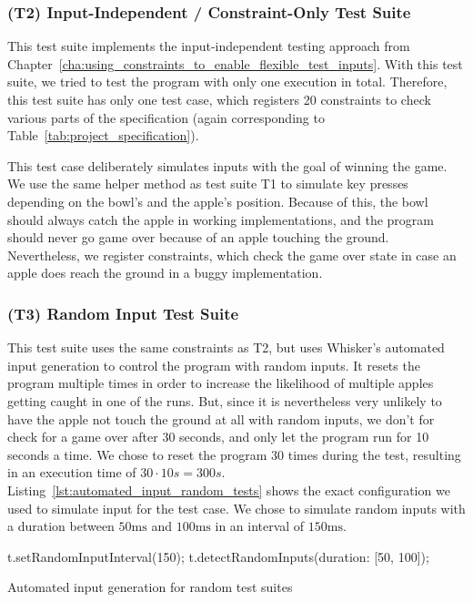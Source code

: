 \subsubsection{(T2) Input-Independent / Constraint-Only Test Suite}

This test suite implements the input-independent testing approach from Chapter~\ref{cha:using_constraints_to_enable_flexible_test_inputs}.
With this test suite, we tried to test the program with only one execution in total.
Therefore, this test suite has only one test case, which registers 20 constraints to check various parts of the specification
(again corresponding to Table~\ref{tab:project_specification}).
\parspace

This test case deliberately simulates inputs with the goal of winning the game.
We use the same helper method as test suite T1 to simulate key presses depending on the bowl's and the apple's position.
Because of this, the bowl should always catch the apple in working implementations,
and the program should never go game over because of an apple touching the ground.
Nevertheless, we register constraints, which check the game over state in case an apple does reach the ground in a buggy implementation.

\subsubsection{(T3) Random Input Test Suite}

This test suite uses the same constraints as T2, but uses Whisker's automated input generation to control the program with random inputs.
It resets the program multiple times in order to increase the likelihood of multiple apples getting caught in one of the runs.
But, since it is nevertheless very unlikely to have the apple not touch the ground at all with random inputs,
we don't for check for a game over after 30 seconds, and only let the program run for 10 seconds a time.
We chose to reset the program 30 times during the test, resulting in an execution time of $30 \cdot 10s = 300s$.
Listing~\ref{lst:automated_input_random_tests} shows the exact configuration we used to simulate input for the test case.
We chose to simulate random inputs with a duration between $50\text{ms}$ and $100\text{ms}$ in an interval of $150\text{ms}$.
\parspace

\begin{listing}[htpb]
    \centering
    \begin{minipage}{.55\textwidth}
        \begin{javascriptcode}
            t.setRandomInputInterval(150);
            t.detectRandomInputs({duration: [50, 100]});
        \end{javascriptcode}
    \end{minipage}
    \caption{Automated input generation for random test suites}
    \label{lst:automated_input_random_tests}
\end{listing}

